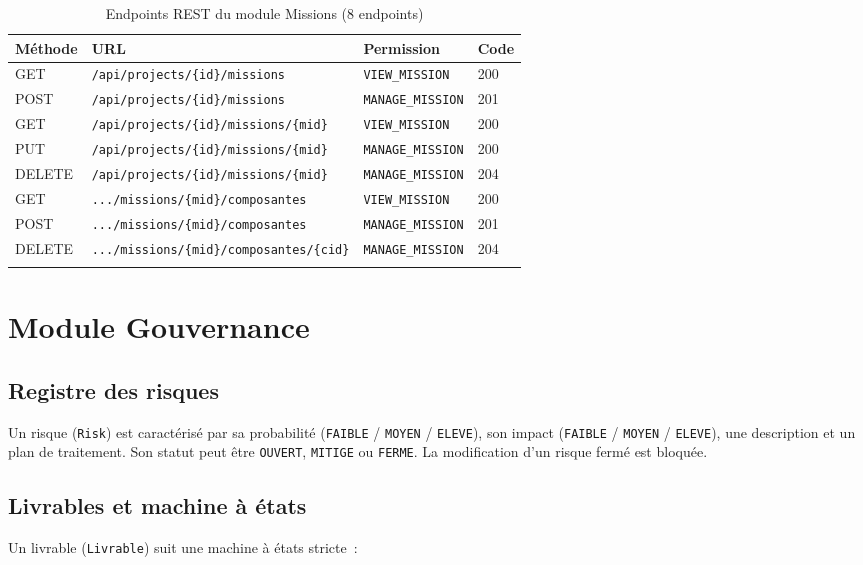 \begin{longtable}{|m{1.8cm}|m{7.5cm}|m{3.5cm}|m{1.5cm}|}
\hline
\textbf{Méthode} & \textbf{URL} & \textbf{Permission} & \textbf{Code} \\
\hline
\endhead
\endfoot
\endlastfoot
\hline
GET & \texttt{/api/projects/\{id\}/missions} & \texttt{VIEW\_MISSION} & 200 \\
\hline
POST & \texttt{/api/projects/\{id\}/missions} & \texttt{MANAGE\_MISSION} & 201 \\
\hline
GET & \texttt{/api/projects/\{id\}/missions/\{mid\}} & \texttt{VIEW\_MISSION} & 200 \\
\hline
PUT & \texttt{/api/projects/\{id\}/missions/\{mid\}} & \texttt{MANAGE\_MISSION} & 200 \\
\hline
DELETE & \texttt{/api/projects/\{id\}/missions/\{mid\}} & \texttt{MANAGE\_MISSION} & 204 \\
\hline
GET & \texttt{.../missions/\{mid\}/composantes} & \texttt{VIEW\_MISSION} & 200 \\
\hline
POST & \texttt{.../missions/\{mid\}/composantes} & \texttt{MANAGE\_MISSION} & 201 \\
\hline
DELETE & \texttt{.../missions/\{mid\}/composantes/\{cid\}} & \texttt{MANAGE\_MISSION} & 204 \\
\hline
\caption{Endpoints REST du module Missions (8 endpoints)}
\label{tab:mission-api}
\end{longtable}

\section{Module Gouvernance}

\subsection{Registre des risques}

Un risque (\texttt{Risk}) est caractérisé par sa probabilité (\texttt{FAIBLE} / \texttt{MOYEN} /
\texttt{ELEVE}), son impact (\texttt{FAIBLE} / \texttt{MOYEN} / \texttt{ELEVE}), une description
et un plan de traitement. Son statut peut être \texttt{OUVERT}, \texttt{MITIGE} ou \texttt{FERME}.
La modification d'un risque fermé est bloquée.

\subsection{Livrables et machine à états}

Un livrable (\texttt{Livrable}) suit une machine à états stricte~:

